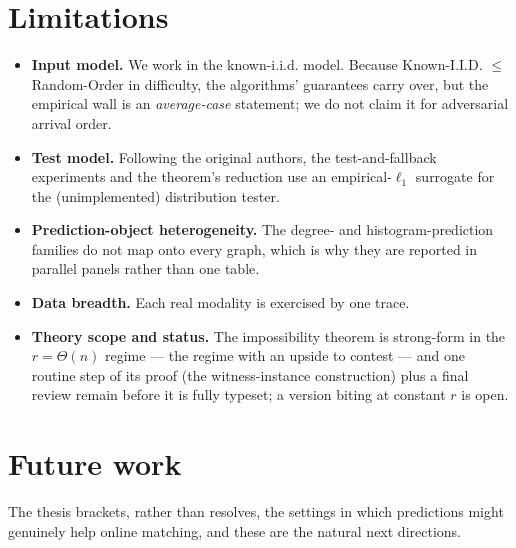 \section{Limitations}\label{limitations}

\begin{itemize}
\tightlist
\item
  \textbf{Input model.} We work in the known-i.i.d. model. Because Known-I.I.D. \(\le\)
  Random-Order in difficulty, the algorithms' guarantees carry over, but the empirical wall
  is an \emph{average-case} statement; we do not claim it for adversarial arrival order.
\item
  \textbf{Test model.} Following the original authors, the test-and-fallback experiments and the
  theorem's reduction use an empirical-\(\ell_1\) surrogate for the (unimplemented)
  distribution tester.
\item
  \textbf{Prediction-object heterogeneity.} The degree- and histogram-prediction families do not
  map onto every graph, which is why they are reported in parallel panels rather than one
  table.
\item
  \textbf{Data breadth.} Each real modality is exercised by one trace.
\item
  \textbf{Theory scope and status.} The impossibility theorem is strong-form in the
  \(r=\Theta(n)\) regime --- the regime with an upside to contest --- and one routine step of its
  proof (the witness-instance construction) plus a final review remain before it is fully
  typeset; a version biting at constant \(r\) is open.
\end{itemize}

\section{Future work}\label{future-work}

The thesis brackets, rather than resolves, the settings in which predictions might genuinely
help online matching, and these are the natural next directions.

